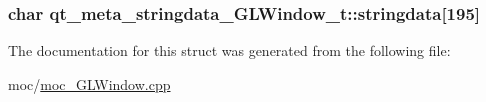 \subsubsection[{stringdata}]{\setlength{\rightskip}{0pt plus 5cm}char qt\+\_\+meta\+\_\+stringdata\+\_\+\+G\+L\+Window\+\_\+t\+::stringdata\mbox{[}195\mbox{]}}\label{structqt__meta__stringdata__GLWindow__t_a2c0ffd4837cfdbab8ead589d19d1d0cb}


The documentation for this struct was generated from the following file\+:\begin{DoxyCompactItemize}
\item 
moc/\hyperlink{moc__GLWindow_8cpp}{moc\+\_\+\+G\+L\+Window.\+cpp}\end{DoxyCompactItemize}
